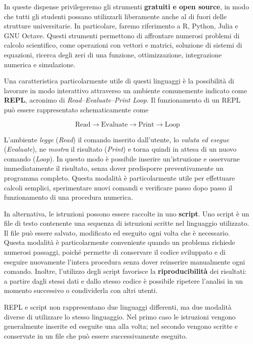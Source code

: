 In queste dispense privilegeremo gli strumenti \textbf{gratuiti e open source},
in modo che tutti gli studenti possano utilizzarli liberamente anche al di fuori
delle strutture universitarie. In particolare, faremo riferimento a R, Python,
Julia e GNU Octave. Questi strumenti permettono di affrontare numerosi problemi
di calcolo scientifico, come operazioni con vettori e matrici, soluzione di
sistemi di equazioni, ricerca degli zeri di una funzione, ottimizzazione,
integrazione numerica e simulazione.

Una caratteristica particolarmente utile di questi linguaggi è la possibilità
di lavorare in modo interattivo attraverso un ambiente comunemente indicato
come \textbf{REPL}, acronimo di \emph{Read--Evaluate--Print Loop}. Il
funzionamento di un REPL può essere rappresentato schematicamente come

\[
\text{Read}
\longrightarrow
\text{Evaluate}
\longrightarrow
\text{Print}
\longrightarrow
\text{Loop}
\]

L'ambiente \emph{legge} (\emph{Read}) il comando inserito dall'utente, lo
\emph{valuta ed esegue} (\emph{Evaluate}), ne \emph{mostra} il risultato
(\emph{Print}) e torna quindi in attesa di un nuovo comando (\emph{Loop}).
In questo modo è possibile inserire un'istruzione e osservarne immediatamente
il risultato, senza dover predisporre preventivamente un programma completo.
Questa modalità è particolarmente utile per effettuare calcoli semplici,
sperimentare nuovi comandi e verificare passo dopo passo il funzionamento di
una procedura numerica.

In alternativa, le istruzioni possono essere raccolte in uno
\textbf{script}. Uno script è un file di testo contenente una sequenza di
istruzioni scritte nel linguaggio utilizzato. Il file può essere salvato,
modificato ed eseguito ogni volta che è necessario. Questa modalità è
particolarmente conveniente quando un problema richiede numerosi passaggi,
poiché permette di conservare il codice sviluppato e di eseguire nuovamente
l'intera procedura senza dover reinserire manualmente ogni comando. Inoltre,
l'utilizzo degli script favorisce la \textbf{riproducibilità} dei risultati:
a partire dagli stessi dati e dallo stesso codice è possibile ripetere
l'analisi in un momento successivo o condividerla con altri utenti.

REPL e script non rappresentano due linguaggi differenti, ma due modalità
diverse di utilizzare lo stesso linguaggio. Nel primo caso le istruzioni
vengono generalmente inserite ed eseguite una alla volta; nel secondo vengono
scritte e conservate in un file che può essere successivamente eseguito.

